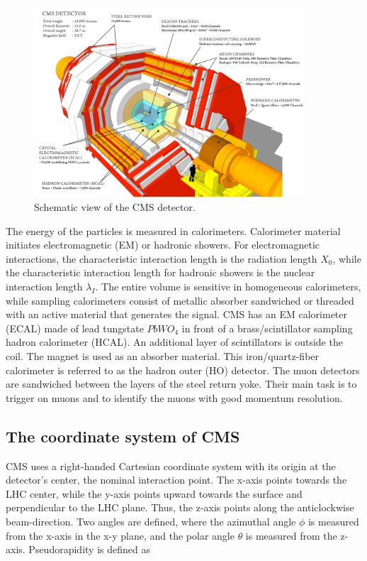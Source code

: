 \begin{figure}[htbp]
  \centering
  \includegraphics[width=0.9\textwidth]{plots/chapter3/cms_layered.png}
  \caption{Schematic view of the CMS detector.}
  \label{fig:cms}
\end{figure}

The energy of the particles is measured in calorimeters. Calorimeter material initiates electromagnetic (EM) or hadronic showers. For electromagnetic interactions, the characteristic interaction length is the radiation length $X_0$, while the characteristic interaction length for hadronic showers is the nuclear interaction length $\lambda_I$. The entire volume is sensitive in homogeneous calorimeters, while sampling calorimeters consist of metallic absorber sandwiched or threaded with an active material that generates the signal. CMS has an EM calorimeter (ECAL) made of lead tungstate $PbWO_{4}$ in front of a brass/scintillator sampling hadron calorimeter (HCAL). An additional layer of scintillators is outside the coil. The magnet is used as an absorber material. This iron/quartz-fiber calorimeter is referred to as the hadron outer (HO) detector. The muon detectors are sandwiched between the layers of the steel return yoke. Their main task is to trigger on muons and to identify the muons with good momentum resolution.

\subsection{The coordinate system of CMS}
CMS uses a right-handed Cartesian coordinate system with its origin at the detector's center, the nominal interaction point. The x-axis points towards the LHC center, while the y-axis points upward towards the surface and perpendicular to the LHC plane. Thus, the z-axis points along the anticlockwise beam-direction. Two angles are defined, where the azimuthal angle $\phi$ is measured from the x-axis in the x-y plane, and the polar angle $\theta$ is measured from the z-axis. Pseudorapidity is defined as

